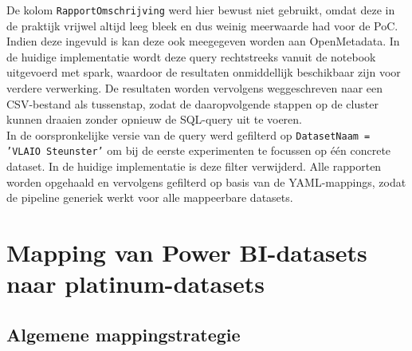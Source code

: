 De kolom \texttt{RapportOmschrijving} werd hier bewust niet gebruikt, omdat deze in de praktijk vrijwel altijd leeg bleek en dus weinig meerwaarde had voor de PoC. Indien deze ingevuld is kan deze ook meegegeven worden aan OpenMetadata. In de huidige implementatie wordt deze query rechtstreeks vanuit de notebook uitgevoerd met spark, waardoor de resultaten onmiddellijk beschikbaar zijn voor verdere verwerking. De resultaten worden vervolgens weggeschreven naar een CSV-bestand als tussenstap, zodat de daaropvolgende stappen op de cluster kunnen draaien zonder opnieuw de SQL-query uit te voeren.\\

In de oorspronkelijke versie van de query werd gefilterd op \texttt{DatasetNaam = 'VLAIO Steunster'} om bij de eerste experimenten te focussen op één concrete dataset. In de huidige implementatie is deze filter verwijderd. Alle rapporten worden opgehaald en vervolgens gefilterd op basis van de YAML-mappings, zodat de pipeline generiek werkt voor alle mappeerbare datasets.\\

\section{Mapping van Power BI-datasets naar platinum-datasets}

\subsection{Algemene mappingstrategie}

